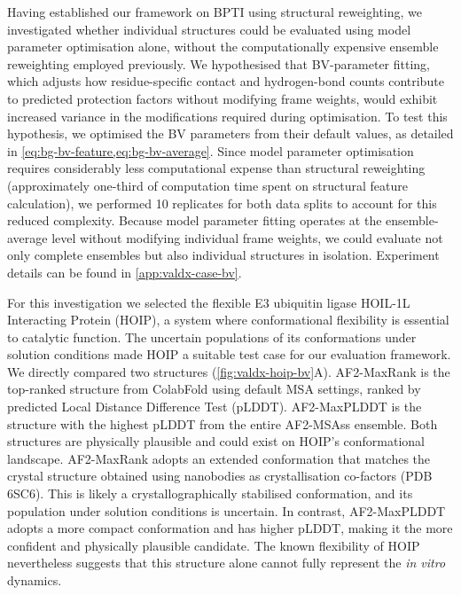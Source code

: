 Having established our framework on BPTI using structural reweighting, we investigated whether individual structures could be evaluated using model parameter optimisation alone, without the computationally expensive ensemble reweighting employed previously. We hypothesised that BV-parameter fitting, which adjusts how residue-specific contact and hydrogen-bond counts contribute to predicted protection factors without modifying frame weights, would exhibit increased variance in the modifications required during optimisation. To test this hypothesis, we optimised the BV parameters from their default values, as detailed in \cref{eq:bg-bv-feature,eq:bg-bv-average}. Since model parameter optimisation requires considerably less computational expense than structural reweighting (approximately one-third of computation time spent on structural feature calculation), we performed 10 replicates for both data splits to account for this reduced complexity. Because model parameter fitting operates at the ensemble-average level without modifying individual frame weights, we could evaluate not only complete ensembles but also individual structures in isolation. Experiment details can be found in \cref{app:valdx-case-bv}.

For this investigation we selected the flexible E3 ubiquitin ligase HOIL-1L Interacting Protein (HOIP),\supercite{tsaiSingleDomainAntibodiesCrystallization2020} a system where conformational flexibility is essential to catalytic function. The uncertain populations of its conformations under solution conditions made HOIP a suitable test case for our evaluation framework. We directly compared two structures (\cref{fig:valdx-hoip-bv}A). AF2-MaxRank is the top-ranked structure from ColabFold using default MSA settings, ranked by predicted Local Distance Difference Test (pLDDT). AF2-MaxPLDDT is the structure with the highest pLDDT from the entire AF2-MSAss ensemble. Both structures are physically plausible and could exist on HOIP's conformational landscape. AF2-MaxRank adopts an extended conformation that matches the crystal structure obtained using nanobodies as crystallisation co-factors (PDB 6SC6).\supercite{tsaiSingleDomainAntibodiesCrystallization2020} This is likely a crystallographically stabilised conformation, and its population under solution conditions is uncertain. In contrast, AF2-MaxPLDDT adopts a more compact conformation and has higher pLDDT, making it the more confident and physically plausible candidate. The known flexibility of HOIP nevertheless suggests that this structure alone cannot fully represent the \textit{in vitro} dynamics.

